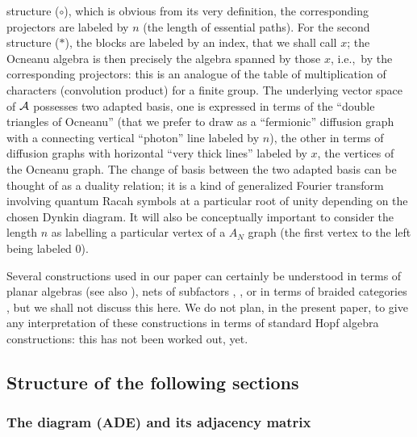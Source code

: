 \documentclass[a4paper,11pt]{article}
\def\ie{{\rm i.e.,\/}\ }
\begin{document}
structure ($\circ$), which is obvious from its very definition,
the corresponding projectors are labeled by $n$ (the length of
essential paths). For the second structure ($\ast$), the blocks
are labeled by an index, that we shall call $x$; the Ocneanu algebra
is then precisely the algebra spanned by those $x$, \ie by the
corresponding projectors: this is an analogue of the table of multiplication of
characters (convolution product) for a  finite group.
The underlying vector space of ${\cal A}$
possesses two adapted basis, one is expressed in terms of the ``double
triangles of Ocneanu'' (that we prefer to draw as a ``fermionic''
diffusion graph
with a connecting vertical ``photon'' line labeled by $n$), the other in terms
of diffusion graphs with horizontal ``very thick lines'' labeled by $x$, the
vertices of the Ocneanu graph. The change of basis between the two
adapted basis can be thought of as a duality relation; it is a kind
of generalized Fourier
transform involving quantum Racah symbols at a particular root of unity
depending on the chosen
Dynkin diagram. It will also be conceptually important to
consider the length $n$ as labelling a particular vertex of a $A_{N}$
graph (the first vertex to the left being labeled $0$).

Several constructions used in our paper can certainly be understood in terms of
planar algebras \cite{Jones:planar} (see also \cite{Jones:book}), nets of subfactors
\cite{Evans-1}, \cite{Evans-2},  or in
terms of braided categories
\cite{Kirilov:ADE}, but we shall not discuss this here.
We do not plan, in the present paper, to give any interpretation of
these constructions in terms of standard Hopf algebra constructions:
this has not been worked out, yet.


\subsection{Structure of the following sections}

\subsubsection{The diagram (ADE) and its adjacency matrix}
\end{document}
